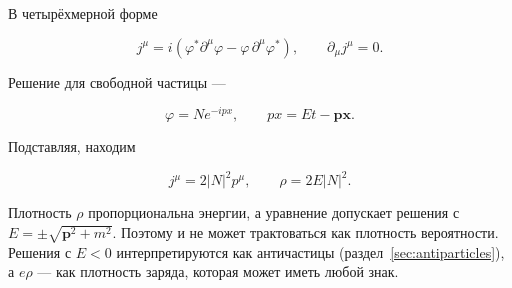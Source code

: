 \documentclass[../final.tex]{subfiles}
\begin{document}
В четырёхмерной форме

\begin{equation*}
    j^\mu
    =
    i\left(
        \varphi^*\partial^\mu\varphi
        -
        \varphi\,\partial^\mu\varphi^*
    \right),
    \qquad
    \partial_\mu j^\mu=0.
\end{equation*}

Решение для свободной частицы ---

\begin{equation*}
    \varphi=Ne^{-ipx},
    \qquad
    px=Et-\mathbf p\mathbf x.
\end{equation*}

Подставляя, находим

\begin{equation*}
    j^\mu=2|N|^2p^\mu,
    \qquad
    \rho=2E|N|^2.
\end{equation*}

\remark
Плотность $\rho$ пропорциональна энергии, а уравнение
допускает решения с $E=\pm\sqrt{\mathbf p^2+m^2}$.
Поэтому 
и не может трактоваться как плотность вероятности.
Решения с $E<0$ интерпретируются как античастицы
(раздел~\ref{sec:antiparticles}), а $e\rho$ --- как плотность
заряда, которая может иметь любой знак.
\end{document}
